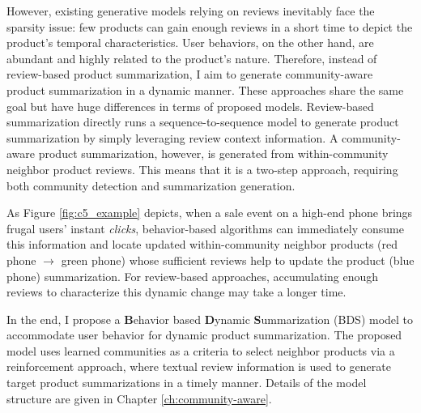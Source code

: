 However, existing generative models relying on reviews inevitably face the sparsity issue: few products can gain enough reviews in a short time to depict the product’s temporal characteristics. User behaviors, on the other hand, are abundant and highly related to the product’s nature. Therefore, instead of review-based product summarization, I aim to generate community-aware product summarization in a dynamic manner. These approaches share the same goal but have huge differences in terms of proposed models. Review-based summarization directly runs a sequence-to-sequence model to generate product summarization by simply leveraging review context information. A community-aware product summarization, however, is generated from within-community neighbor product reviews. This means that it is a two-step approach, requiring both community detection and summarization generation.

As Figure \ref{fig:c5_example} depicts, when a sale event on a high-end phone brings frugal users' instant \textit{clicks}, behavior-based algorithms can immediately consume this information and locate updated within-community neighbor products (red phone $\rightarrow$ green phone) whose sufficient reviews help to update the product (blue phone) summarization. For review-based approaches, accumulating enough reviews to characterize this dynamic change may take a longer time. 

In the end,  I propose a  \textbf{B}ehavior based \textbf{D}ynamic \textbf{S}ummarization (BDS) model to accommodate user behavior for dynamic product summarization. The proposed model uses learned communities as a criteria to select neighbor products via a reinforcement approach, where textual review information is used to generate target product summarizations in a timely manner. Details of the model structure are given in Chapter \ref{ch:community-aware}.